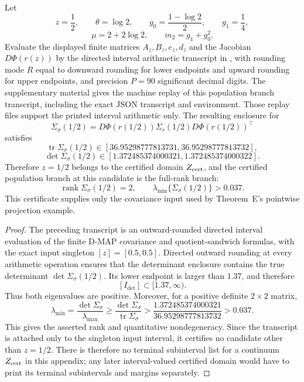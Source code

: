 \begin{lemma}[Certified population full-rank branch at \(z=1/2\)]\label{lem:z-half-diagonal-branch-certificate-main}
Let
\[
z=\frac12,\qquad \theta=\log2,\qquad
g_0=\frac{1-\log2}{2},\qquad g_1=\frac14,
\]
\[
\mu=2+2\log2,\qquad m_2=g_1+g_0^2 .
\]
Evaluate the displayed finite matrices \(A_z,B_z,e_z,d_z\) and the Jacobian
\(D\Phi(r(z))\) by the directed interval arithmetic transcript in
, with
rounding mode \(R\) equal to downward rounding for lower endpoints and upward
rounding for upper endpoints, and precision \(P=90\) significant decimal
digits.  The supplementary material gives the machine replay of this
population branch transcript, including the exact JSON transcript and
environment.  Those replay files support the printed interval arithmetic only.
The resulting enclosure for
\[
\Sigma_\sigma(1/2)
=D\Phi(r(1/2))\Sigma_r(1/2)D\Phi(r(1/2))^\top
\]
satisfies
\[
\operatorname{tr}\Sigma_\sigma(1/2)
\in[36.95298777813731,36.95298777813732],
\]
\[
\det\Sigma_\sigma(1/2)
\in[1.372485374000321,1.372485374000322].
\]
Therefore \(z=1/2\) belongs to the certified domain \(Z_{\rm cert}\), and the
certified population branch at this candidate is the full-rank branch:
\[
\operatorname{rank}\Sigma_\sigma(1/2)=2,\qquad
\lambda_{\min}\{\Sigma_\sigma(1/2)\}>0.037.
\]
This certificate supplies only the covariance input used by Theorem~E's
pointwise projection example.
\end{lemma}

\begin{proof}
The preceding transcript is an outward-rounded directed interval evaluation of
the finite D-MAP covariance and quotient-sandwich formulas, with the exact
input singleton \([z]=[0.5,0.5]\).  Directed outward rounding at every
arithmetic operation ensures that the determinant enclosure contains the true determinant
\(\det\Sigma_\sigma(1/2)\).  Its lower endpoint is larger than \(1.37\), and
therefore
\[
[I_{\det}]\subset[1.37,\infty).
\]
Thus both eigenvalues are positive.  Moreover, for a positive definite
\(2\times2\) matrix,
\[
\lambda_{\min}=\frac{\det\Sigma_\sigma}{\lambda_{\max}}
\ge\frac{\det\Sigma_\sigma}{\operatorname{tr}\Sigma_\sigma}
>\frac{1.372485374000321}{36.95298777813732}>0.037.
\]
This gives the asserted rank and quantitative nondegeneracy.  Since the transcript is attached
only to the singleton input interval, it certifies no candidate other than
\(z=1/2\).  There is therefore no terminal subinterval list for a continuum
\(Z_{\rm cert}\) in this appendix; any later interval-valued certified domain
would have to print its terminal subintervals and margins separately.
\end{proof}
